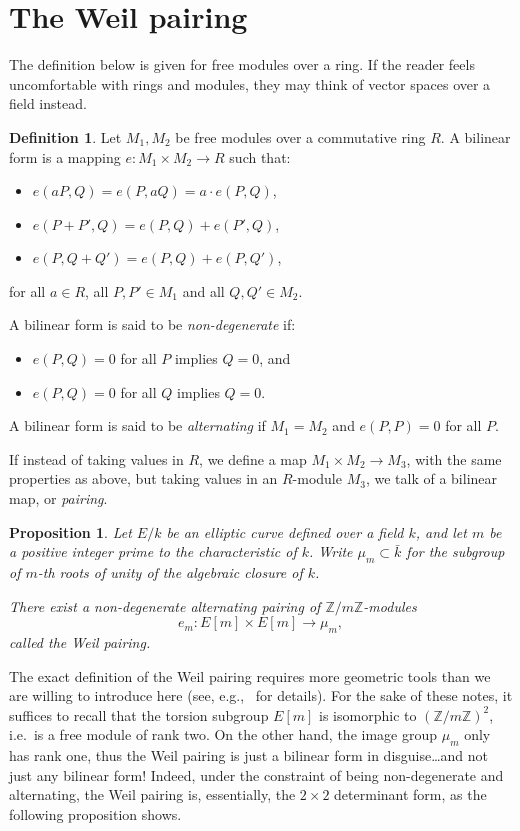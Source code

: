 \documentclass[10pt]{article}
\theoremstyle{plain}
\newtheorem{proposition}[theorem]{Proposition}
\theoremstyle{definition}
\newtheorem{definition}[theorem]{Definition}
\begin{document}
\section{The Weil pairing}
\label{sec:weil-pairing}

The definition below is given for free modules over a ring. %
If the reader feels uncomfortable with rings and modules, they may
think of vector spaces over a field instead.

\begin{definition}
  Let $M_1, M_2$ be free modules over a commutative ring $R$. %
  A bilinear form is a mapping $e:M_1\times M_2\to R$ such that:
  \begin{itemize}
  \item $e(aP,Q) = e(P,aQ) = a\cdot e(P,Q)$,
  \item $e(P+P', Q) = e(P,Q) + e(P',Q)$,
  \item $e(P, Q+Q') = e(P,Q) + e(P,Q')$,
  \end{itemize}
  for all $a\in R$, all $P,P'\in M_1$ and all $Q,Q'\in M_2$.

  A bilinear form is said to be \emph{non-degenerate} if:
  \begin{itemize}
  \item $e(P,Q)=0$ for all $P$ implies $Q=0$, and
  \item $e(P,Q)=0$ for all $Q$ implies $Q=0$.
  \end{itemize}

  A bilinear form is said to be \emph{alternating} if $M_1=M_2$ and
  $e(P,P)=0$ for all $P$.
\end{definition}

If instead of taking values in $R$, we define a map
$M_1\times M_2\to M_3$, with the same properties as above, but taking
values in an $R$-module $M_3$, we talk of a bilinear map, or
\emph{pairing}. %

\begin{proposition} 
  Let $E/k$ be an elliptic curve defined over a field $k$, and let $m$
  be a positive integer prime to the characteristic of $k$. %
  Write $\mu_m\subset\bar{k}$ for the subgroup of $m$-th roots of
  unity of the algebraic closure of $k$.
  
  There exist a non-degenerate alternating pairing of $ℤ/mℤ$-modules
  \[e_m:E[m]\times E[m]\to \mu_m,\]
  called the \emph{Weil pairing}.
\end{proposition}

The exact definition of the Weil pairing requires more geometric tools
than we are willing to introduce here (see,
e.g.,~\cite{silverman:elliptic,galbraith2012mathematics} for
details). %
For the sake of these notes, it suffices to recall that the torsion
subgroup $E[m]$ is isomorphic to $(ℤ/mℤ)^2$, i.e.\ is a free module of
rank two. %
On the other hand, the image group $\mu_m$ only has rank one, thus the
Weil pairing is just a bilinear form in disguise\dots and not just any
bilinear form! %
Indeed, under the constraint of being non-degenerate and alternating,
the Weil pairing is, essentially, the $2×2$ determinant form, as the
following proposition shows.
\end{document}
